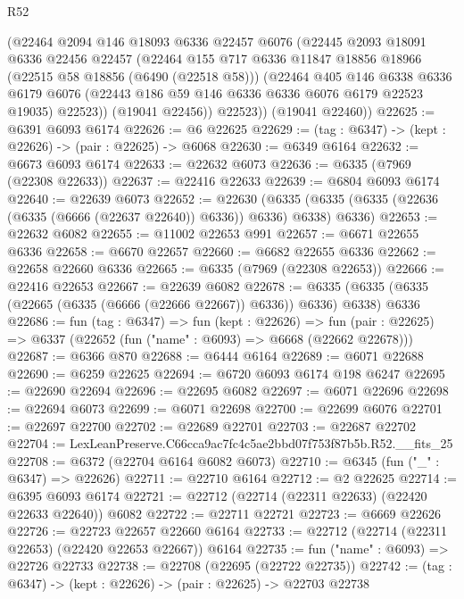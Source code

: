 \begin{lexlean}{R52}
\begin{coremodule}
        (@22464
          @2094
          @146
          @18093
          @6336
          @22457
          @6076
          (@22445
            @2093
            @18091
            @6336
            @22456
            @22457
            (@22464
              @155
              @717
              @6336
              @11847
              @18856
              @18966
              (@22515 @58 @18856 (@6490 (@22518 @58)))
              (@22464
                @405
                @146
                @6338
                @6336
                @6179
                @6076
                (@22443 @186 @59 @146 @6336 @6336 @6076 @6179 @22523 @19035)
                @22523))
            (@19041 @22456))
          @22523))
      (@19041 @22460))
@22625 := @6391 @6093 @6174
@22626 := @6 @22625
@22629 := (tag : @6347) -> (kept : @22626) -> (pair : @22625) -> @6068
@22630 := @6349 @6164
@22632 := @6673 @6093 @6174
@22633 := @22632 @6073
@22636 := @6335 (@7969 (@22308 @22633))
@22637 := @22416 @22633
@22639 := @6804 @6093 @6174
@22640 := @22639 @6073
@22652 := @22630
    (@6335 (@6335 (@6335 (@22636 (@6335 (@6666 (@22637 @22640)) @6336)) @6336) @6338) @6336)
@22653 := @22632 @6082
@22655 := @11002 @22653 @991
@22657 := @6671 @22655 @6336
@22658 := @6670 @22657
@22660 := @6682 @22655 @6336
@22662 := @22658 @22660 @6336
@22665 := @6335 (@7969 (@22308 @22653))
@22666 := @22416 @22653
@22667 := @22639 @6082
@22678 := @6335 (@6335 (@6335 (@22665 (@6335 (@6666 (@22666 @22667)) @6336)) @6336) @6338) @6336
@22686 := fun (tag : @6347) =>
  fun (kept : @22626) =>
  fun (pair : @22625) => @6337 (@22652 (fun ("name" : @6093) => @6668 (@22662 @22678)))
@22687 := @6366 @870
@22688 := @6444 @6164
@22689 := @6071 @22688
@22690 := @6259 @22625
@22694 := @6720 @6093 @6174 @198 @6247
@22695 := @22690 @22694
@22696 := @22695 @6082
@22697 := @6071 @22696
@22698 := @22694 @6073
@22699 := @6071 @22698
@22700 := @22699 @6076
@22701 := @22697 @22700
@22702 := @22689 @22701
@22703 := @22687 @22702
@22704 := LexLeanPreserve.C66cca9ac7fc4c5ae2bbd07f753f87b5b.R52.__fits_25
@22708 := @6372 (@22704 @6164 @6082 @6073)
@22710 := @6345 (fun ("_" : @6347) => @22626)
@22711 := @22710 @6164
@22712 := @2 @22625
@22714 := @6395 @6093 @6174
@22721 := @22712 (@22714 (@22311 @22633) (@22420 @22633 @22640)) @6082
@22722 := @22711 @22721
@22723 := @6669 @22626
@22726 := @22723 @22657 @22660 @6164
@22733 := @22712 (@22714 (@22311 @22653) (@22420 @22653 @22667)) @6164
@22735 := fun ("name" : @6093) => @22726 @22733
@22738 := @22708 (@22695 (@22722 @22735))
@22742 := (tag : @6347) -> (kept : @22626) -> (pair : @22625) -> @22703 @22738

\end{coremodule}
\end{lexlean}
